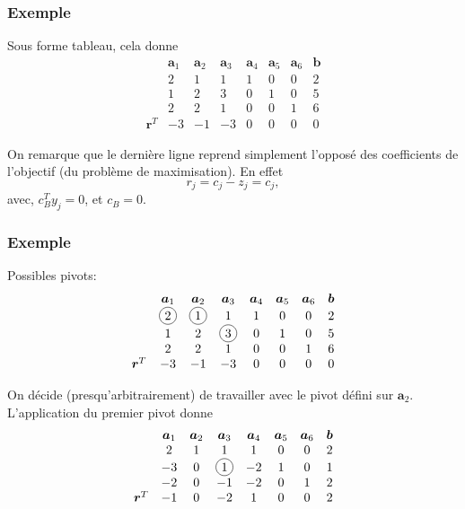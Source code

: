 \documentclass[t,usepdftitle=false]{beamer}
\newcommand*\circled[1]{\tikz[baseline=(char.base)]{
    \node[shape=circle,draw,inner sep=2pt] (char) {#1};}}
\def\ba{\boldsymbol{a}}
\def\bb{\boldsymbol{b}}
\def\br{\boldsymbol{r}}
\begin{document}
\begin{frame}
\frametitle{Exemple}

Sous forme tableau, cela donne
\[
\begin{matrix}
& \ba_1 & \ba_2 & \ba_3 & \ba_4 & \ba_5 &\ba_6 & \bb \\
& 2 & 1 & 1 & 1 & 0 & 0 & 2 \\
& 1 & 2 & 3 & 0 & 1 & 0 & 5 \\
& 2 & 2 & 1 & 0 & 0 & 1 & 6 \\
\br^T & -3 & -1 & -3 & 0 & 0 & 0 & 0
\end{matrix}
\]

On remarque que le dernière ligne reprend simplement l'opposé des coefficients de l'objectif (du problème de maximisation). En effet
\[
r_j = c_j - z_j = c_j,
\]
avec, $c_B^Ty_j = 0$, et $c_B = 0$.

\end{frame}

\begin{frame}
\frametitle{Exemple}

Possibles pivots:
\[
\begin{matrix}
& \ba_1 & \ba_2 & \ba_3 & \ba_4 & \ba_5 &\ba_6 & \bb \\
& \circled{2} & \circled{1} & 1 & 1 & 0 & 0 & 2 \\
& 1 & 2 & \circled{3} & 0 & 1 & 0 & 5 \\
& 2 & 2 & 1 & 0 & 0 & 1 & 6 \\
\br^T & -3 & -1 & -3 & 0 & 0 & 0 & 0
\end{matrix}
\]

\mbox{}

On décide (presqu'arbitrairement) de travailler avec le pivot défini sur $\ba_2$. L'application du premier pivot donne
\[
\begin{matrix}
& \ba_1 & \ba_2 & \ba_3 & \ba_4 & \ba_5 &\ba_6 & \bb \\
& 2 & 1 & 1 & 1 & 0 & 0 & 2 \\
& -3 & 0 & \circled{1} & -2 & 1 & 0 & 1 \\
& -2 & 0 & -1 & -2 & 0 & 1 & 2 \\
\br^T & -1 & 0 & -2 & 1 & 0 & 0 & 2
\end{matrix}
\]

\end{frame}
\end{document}
